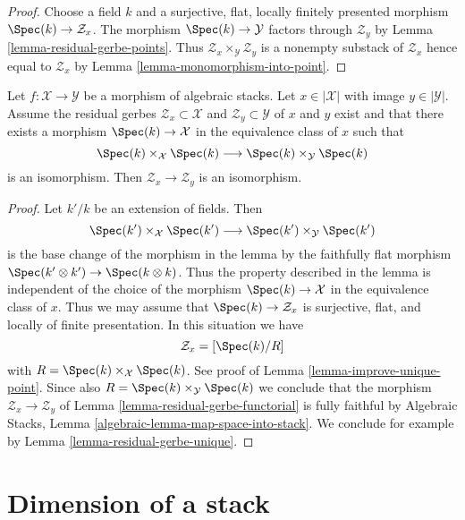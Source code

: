 \begin{proof}
Choose a field $k$ and a surjective, flat, locally finitely presented
morphism $\Spec(k) \to \mathcal{Z}_x$. The morphism
$\Spec(k) \to \mathcal{Y}$ factors through $\mathcal{Z}_y$ by
Lemma \ref{lemma-residual-gerbe-points}.
Thus $\mathcal{Z}_x \times_\mathcal{Y} \mathcal{Z}_y$
is a nonempty substack of $\mathcal{Z}_x$
hence equal to $\mathcal{Z}_x$ by Lemma \ref{lemma-monomorphism-into-point}.
\end{proof}

\begin{lemma}
\label{lemma-residual-gerbe-isomorphic}
Let $f : \mathcal{X} \to \mathcal{Y}$ be a morphism of algebraic stacks.
Let $x \in |\mathcal{X}|$ with image $y \in |\mathcal{Y}|$.
Assume the residual gerbes $\mathcal{Z}_x \subset \mathcal{X}$
and $\mathcal{Z}_y \subset \mathcal{Y}$ of $x$ and $y$ exist
and that there exists a morphism $\Spec(k) \to \mathcal{X}$
in the equivalence class of $x$ such that
$$
\Spec(k) \times_\mathcal{X} \Spec(k)
\longrightarrow
\Spec(k) \times_\mathcal{Y} \Spec(k)
$$
is an isomorphism. Then $\mathcal{Z}_x \to \mathcal{Z}_y$
is an isomorphism.
\end{lemma}

\begin{proof}
Let $k'/k$ be an extension of fields. Then
$$
\Spec(k') \times_\mathcal{X} \Spec(k')
\longrightarrow
\Spec(k') \times_\mathcal{Y} \Spec(k')
$$
is the base change of the morphism in the lemma by the
faithfully flat morphism $\Spec(k' \otimes k') \to \Spec(k \otimes k)$.
Thus the property described in the lemma is independent of the
choice of the morphism $\Spec(k) \to \mathcal{X}$ in the
equivalence class of $x$. Thus we may assume that
$\Spec(k) \to \mathcal{Z}_x$ is surjective, flat, and
locally of finite presentation. In this situation we have
$$
\mathcal{Z}_x = [\Spec(k)/R]
$$
with $R = \Spec(k) \times_\mathcal{X} \Spec(k)$. See
proof of Lemma \ref{lemma-improve-unique-point}.
Since also $R = \Spec(k) \times_\mathcal{Y} \Spec(k)$
we conclude that the morphism $\mathcal{Z}_x \to \mathcal{Z}_y$
of Lemma \ref{lemma-residual-gerbe-functorial}
is fully faithful by
Algebraic Stacks, Lemma \ref{algebraic-lemma-map-space-into-stack}.
We conclude for example by Lemma \ref{lemma-residual-gerbe-unique}.
\end{proof}








\section{Dimension of a stack}
\label{section-dimension}

